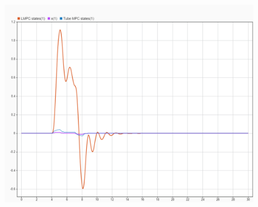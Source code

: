 \begin{figure}[H]
	\centering
	\includegraphics[width=1\linewidth]{../img/25}
	\caption{}
	\label{fig:25}
\end{figure}

\newpage
